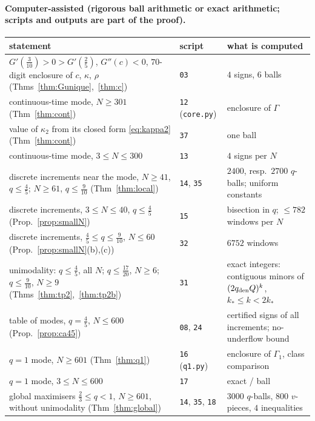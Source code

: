 \documentclass[11pt,a4paper]{article}
\theoremstyle{definition}
\theoremstyle{remark}
\begin{document}
\paragraph{Computer-assisted (rigorous ball arithmetic or exact arithmetic; scripts and outputs are part of the proof).}
\begin{center}\small
\begin{tabular}{p{}p{}p{}}
\toprule
statement & script & what is computed\\
\midrule
$G'(\frac3{10})>0>G'(\frac25)$, $G''(c)<0$, $70$-digit enclosure of $c$, $\kappa$, $\rho$ (Thms~\ref{thm:Gunique},~\ref{thm:c})
 & \texttt{03} & $4$ signs, $6$ balls\\
continuous-time mode, $N\ge301$ (Thm~\ref{thm:cont}) & \texttt{12} (\texttt{core.py}) & enclosure of $\Gamma$\\
value of $\kappa_2$ from its closed form \eqref{eq:kappa2} (Thm~\ref{thm:cont}) & \texttt{37} & one ball\\
continuous-time mode, $3\le N\le300$ & \texttt{13} & $4$ signs per $N$\\
discrete increments near the mode, $N\ge41$, $q\le\frac45$; $N\ge61$, $q\le\frac9{10}$ (Thm~\ref{thm:local}) & \texttt{14}, \texttt{35} & $2400$, resp.\ $2700$ $q$-balls; uniform constants\\
discrete increments, $3\le N\le40$, $q\le\frac45$ (Prop.~\ref{prop:smallN}) & \texttt{15} & bisection in $q$; $\le782$ windows per $N$\\
discrete increments, $\frac45\le q\le\frac9{10}$, $N\le60$ (Prop.~\ref{prop:smallN}(b),(c)) & \texttt{32} & $6752$ windows\\
unimodality: $q\le\frac45$, all $N$; $q\le\frac{17}{20}$, $N\ge6$; $q\le\frac9{10}$, $N\ge9$ (Thms~\ref{thm:tp2},~\ref{thm:tp2b}) & \texttt{31} & exact integers: contiguous minors of $(2q_{\rm den}Q)^k$, $k_*\le k<2k_*$\\
table of modes, $q=\frac45$, $N\le600$ (Prop.~\ref{prop:ca45}) & \texttt{08}, \texttt{24} & certified signs of all increments; no-underflow bound\\
$q=1$ mode, $N\ge601$ (Thm~\ref{thm:q1}) & \texttt{16} (\texttt{q1.py}) & enclosure of $\Gamma_1$, class comparison\\
$q=1$ mode, $3\le N\le600$ & \texttt{17} & exact / ball\\
global maximisers $\frac23\le q<1$, $N\ge601$, without unimodality (Thm~\ref{thm:global}) & \texttt{14}, \texttt{35}, \texttt{18} & $3000$ $q$-balls, $800$ $v$-pieces, $4$ inequalities\\

\end{tabular}
\end{center}
\end{document}
